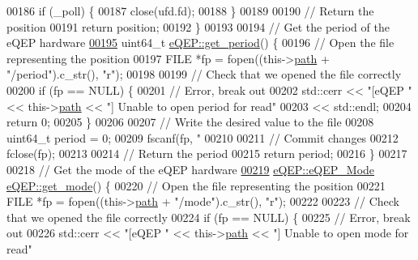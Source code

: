 \begin{DoxyCode}
{{{{00186   \textcolor{keywordflow}{if} (\_poll) \{
00187     close(ufd.fd);
00188   \}
00189 
00190   \textcolor{comment}{// Return the position}
00191   \textcolor{keywordflow}{return} position;
00192 \}
00193 
00194 \textcolor{comment}{// Get the period of the eQEP hardware}
\hypertarget{eqep_8cpp_source_l00195}{}\hyperlink{class_hardware_1_1e_q_e_p_a9ef725e955086baf06b9d8363318d5b3}{00195} uint64\_t \hyperlink{class_hardware_1_1e_q_e_p_a9ef725e955086baf06b9d8363318d5b3}{eQEP::get\_period}() \{
00196   \textcolor{comment}{// Open the file representing the position}
00197   FILE *fp = fopen((this->\hyperlink{class_hardware_1_1e_q_e_p_a82718bc8478cde37f28fc685a859525e}{path} + \textcolor{stringliteral}{"/period"}).c\_str(), \textcolor{stringliteral}{"r"});
00198 
00199   \textcolor{comment}{// Check that we opened the file correctly}
00200   \textcolor{keywordflow}{if} (fp == NULL) \{
00201     \textcolor{comment}{// Error, break out}
00202     std::cerr << \textcolor{stringliteral}{"[eQEP "} << this->\hyperlink{class_hardware_1_1e_q_e_p_a82718bc8478cde37f28fc685a859525e}{path} << \textcolor{stringliteral}{"] Unable to open period for read"}
00203               << std::endl;
00204     \textcolor{keywordflow}{return} 0;
00205   \}
00206 
00207   \textcolor{comment}{// Write the desired value to the file}
00208   uint64\_t period = 0;
00209   fscanf(fp, \textcolor{stringliteral}{"%
00210 
00211   \textcolor{comment}{// Commit changes}
00212   fclose(fp);
00213 
00214   \textcolor{comment}{// Return the period}
00215   \textcolor{keywordflow}{return} period;
00216 \}
00217 
00218 \textcolor{comment}{// Get the mode of the eQEP hardware}
\hypertarget{eqep_8cpp_source_l00219}{}\hyperlink{class_hardware_1_1e_q_e_p_a83f60cc0b6199828a629f54c0849ab16}{00219} \hyperlink{class_hardware_1_1e_q_e_p_a3f97f26c64d49d6f2643a257b7249070}{eQEP::eQEP\_Mode} \hyperlink{class_hardware_1_1e_q_e_p_a83f60cc0b6199828a629f54c0849ab16}{eQEP::get\_mode}() \{
00220   \textcolor{comment}{// Open the file representing the position}
00221   FILE *fp = fopen((this->\hyperlink{class_hardware_1_1e_q_e_p_a82718bc8478cde37f28fc685a859525e}{path} + \textcolor{stringliteral}{"/mode"}).c\_str(), \textcolor{stringliteral}{"r"});
00222 
00223   \textcolor{comment}{// Check that we opened the file correctly}
00224   \textcolor{keywordflow}{if} (fp == NULL) \{
00225     \textcolor{comment}{// Error, break out}
00226     std::cerr << \textcolor{stringliteral}{"[eQEP "} << this->\hyperlink{class_hardware_1_1e_q_e_p_a82718bc8478cde37f28fc685a859525e}{path} << \textcolor{stringliteral}{"] Unable to open mode for read"}
}}}}}
\end{DoxyCode}
